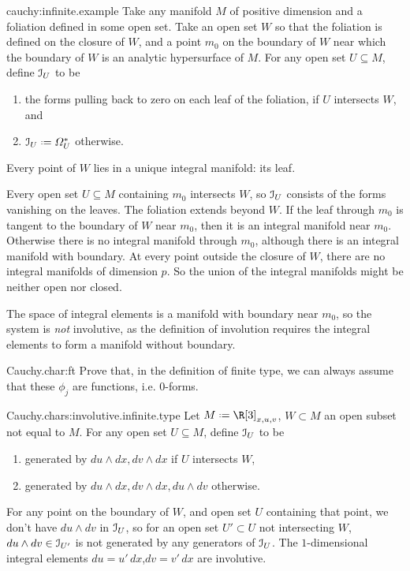 \begin{answer}{cauchy:infinite.example}
Take any manifold \(M\) of positive dimension and a foliation defined in some open set.
Take an open set \(W\) so that the foliation is defined on the closure of \(W\), and a point \(m_0\) on the boundary of \(W\) near which the boundary of \(W\) is an analytic hypersurface of \(M\).
For any open set \(U\subseteq M\), define \(\mathcal{I}_U\) to be 
\begin{enumerate}
\item
the forms pulling back to zero on each leaf of the foliation, if \(U\) intersects \(W\), and
\item \(\II_U\defeq\nForms{*}{U}\) otherwise.
\end{enumerate}
Every point of \(W\) lies in a unique integral manifold: its leaf.

Every open set \(U\subseteq M\) containing \(m_0\) intersects \(W\), so \(\mathcal{I}_U\) consists of the forms vanishing on the leaves.
The foliation extends beyond \(W\).
If the leaf through \(m_0\) is tangent to the boundary of \(W\) near \(m_0\), then it is an integral manifold near \(m_0\).
Otherwise there is no integral manifold through \(m_0\), although there is an integral manifold with boundary.
At every point outside the closure of \(W\), there are no integral manifolds of dimension \(p\).
So the union of the integral manifolds might be neither open nor closed.

The space of integral elements is a manifold with boundary near \(m_0\), so the system is \emph{not} involutive, as the definition of involution requires the integral elements to form a manifold without boundary.
\end{answer}
\begin{problem}{Cauchy.char:ft}
Prove that, in the definition of finite type, we can always assume that these \(\phi_j\) are functions, i.e. \(0\)-forms.
\end{problem}
%
\begin{answer}{Cauchy.chars:involutive.infinite.type}
Let \(M\defeq\R[3]_{x,u,v}\), \(W\subset M\) an open subset not equal to \(M\).
For any open set \(U\subseteq M\), define \(\mathcal{I}_U\) to be 
\begin{enumerate}
\item
generated by \(du\wedge dx,dv\wedge dx\) if \(U\) intersects \(W\),
\item  
generated by \(du\wedge dx,dv\wedge dx,du \wedge dv\) otherwise.
\end{enumerate}
For any point on the boundary of \(W\), and open set \(U\) containing that point, we don't have \(du \wedge dv\) in \(\mathcal{I}_U\), so for an open set \(U'\subset U\) not intersecting \(W\), \(du \wedge dv\in\mathcal{I}_{U'}\) is not generated by any generators of \(\mathcal{I}_U\).
The \(1\)-dimensional integral elements \(du=u'\,dx\),\(dv=v'\,dx\) are involutive.
\end{answer}
